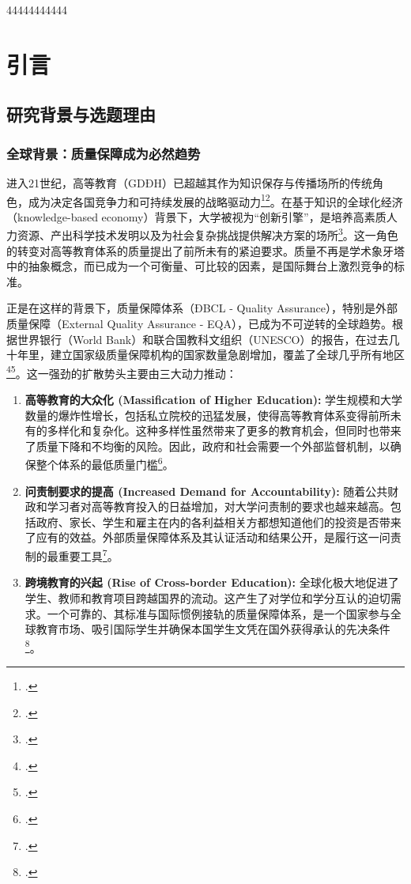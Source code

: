44444444444
\chapter{引言}
\label{chap:gioi_thieu}

\section{研究背景与选题理由}
\label{sec:boi_canh_ly_do}

\subsection{全球背景：质量保障成为必然趋势}

进入21世纪，高等教育（GDĐH）已超越其作为知识保存与传播场所的传统角色，成为决定各国竞争力和可持续发展的战略驱动力\footcite{Altbach2001}\footcite{WB_KnowledgeEconomy}。在基于知识的全球化经济（knowledge-based economy）背景下，大学被视为“创新引擎”，是培养高素质人力资源、产出科学技术发明以及为社会复杂挑战提供解决方案的场所\footcite{OECD_HE2008}。这一角色的转变对高等教育体系的质量提出了前所未有的紧迫要求。质量不再是学术象牙塔中的抽象概念，而已成为一个可衡量、可比较的因素，是国际舞台上激烈竞争的标准。

正是在这样的背景下，质量保障体系（ĐBCL - Quality Assurance），特别是外部质量保障（External Quality Assurance - EQA），已成为不可逆转的全球趋势。根据世界银行（World Bank）和联合国教科文组织（UNESCO）的报告，在过去几十年里，建立国家级质量保障机构的国家数量急剧增加，覆盖了全球几乎所有地区\footcite{WorldBank_QA_GlobalTrends}\footcite{UNESCO_QA2018}。这一强劲的扩散势头主要由三大动力推动：

\begin{enumerate}
    \item \textbf{高等教育的大众化 (Massification of Higher Education):} 学生规模和大学数量的爆炸性增长，包括私立院校的迅猛发展，使得高等教育体系变得前所未有的多样化和复杂化。这种多样性虽然带来了更多的教育机会，但同时也带来了质量下降和不均衡的风险。因此，政府和社会需要一个外部监督机制，以确保整个体系的最低质量门槛\footcite{Trow2007}。
    
    \item \textbf{问责制要求的提高 (Increased Demand for Accountability):} 随着公共财政和学习者对高等教育投入的日益增加，对大学问责制的要求也越来越高。包括政府、家长、学生和雇主在内的各利益相关方都想知道他们的投资是否带来了应有的效益。外部质量保障体系及其认证活动和结果公开，是履行这一问责制的最重要工具\footcite{Harvey2005}。
    
    \item \textbf{跨境教育的兴起 (Rise of Cross-border Education):} 全球化极大地促进了学生、教师和教育项目跨越国界的流动。这产生了对学位和学分互认的迫切需求。一个可靠的、其标准与国际惯例接轨的质量保障体系，是一个国家参与全球教育市场、吸引国际学生并确保本国学生文凭在国外获得承认的先决条件\footcite{Knight2006}。
\end{enumerate}

